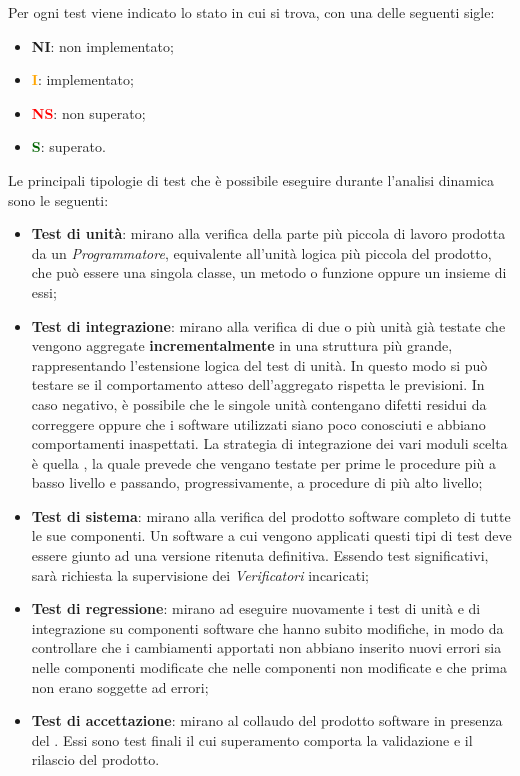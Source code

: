 Per ogni test viene indicato lo stato in cui si trova, con una delle seguenti sigle:
\begin{itemize}
	\item \textbf{NI}: non implementato;
	\item \textcolor{orange}{\textbf{I}}: implementato;
	\item \textcolor{red}{\textbf{NS}}: non superato;
	\item \textcolor{darkgreen}{\textbf{S}}: superato.
\end{itemize}
Le principali tipologie di test che è possibile eseguire durante l'analisi dinamica sono le seguenti:
\begin{itemize}
	\item {\textbf{Test di unità}: mirano alla verifica della parte più piccola di lavoro prodotta da un \emph{Programmatore}, equivalente all'unità logica più piccola del prodotto, che può essere una singola classe, un metodo o funzione oppure un insieme di essi;}
	\item {\textbf{Test di integrazione}: mirano alla verifica di due o più unità già testate che vengono aggregate \textbf{incrementalmente} in una struttura più grande, rappresentando l’estensione logica del test di unità. In questo modo si può testare se il comportamento atteso dell'aggregato rispetta le previsioni. In caso negativo, è possibile che le singole unità contengano difetti residui da correggere oppure che i software utilizzati siano poco conosciuti e abbiano comportamenti inaspettati.
	La strategia di integrazione dei vari moduli scelta è quella , la quale prevede che vengano testate per prime le procedure più a basso livello e passando, progressivamente, a procedure di più alto livello;}
	\item {\textbf{Test di sistema}: mirano alla verifica del prodotto software completo di tutte le sue componenti. Un software a cui vengono applicati questi tipi di test deve essere giunto ad una versione ritenuta definitiva.
	Essendo test significativi, sarà richiesta la supervisione dei \emph{Verificatori} incaricati;}
	\item {\textbf{Test di regressione}: mirano ad eseguire nuovamente i test di unità e di integrazione su componenti software che hanno subito modifiche, in modo da controllare che i cambiamenti apportati non abbiano inserito nuovi errori sia nelle componenti modificate che nelle componenti non modificate e che prima non erano soggette ad errori;}
	\item {\textbf{Test di accettazione}: mirano al collaudo del prodotto software in presenza del . Essi sono test finali il cui superamento comporta la validazione e il rilascio del prodotto.}
\end{itemize}

